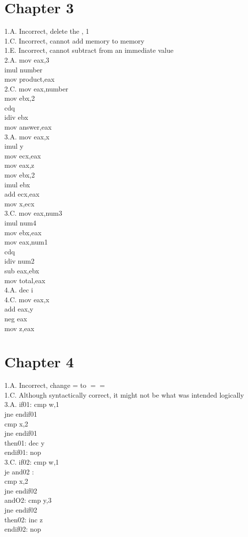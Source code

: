 \documentclass[10pt]{article}
\begin{document}
\section*{Chapter 3}
1.A. Incorrect, delete the , 1\\
1.C. Incorrect, cannot add memory to memory\\
1.E. Incorrect, cannot subtract from an immediate value\\
2.A. mov eax,3\\
imul number\\
mov product,eax\\
2.C. mov eax,number\\
mov ebx,2\\
cdq\\
idiv ebx\\
mov answer,eax\\
3.A. mov eax,x\\
imul y\\
mov ecx,eax\\
mov eax,z\\
mov ebx,2\\
imul ebx\\
add ecx,eax\\
mov x,ecx\\
3.C. mov eax,num3\\
imul num4\\
mov ebx,eax\\
mov eax,num1\\
cdq\\
idiv num2\\
sub eax,ebx\\
mov total,eax\\
4.A. dec i\\
4.C. mov eax,x\\
add eax,y\\
neg eax\\
mov z,eax

\section*{Chapter 4}
1.A. Incorrect, change = to $==$\\
1.C. Although syntactically correct, it might not be what was intended logically\\
3.A. if01: cmp w,1\\
jne endif01\\
cmp x,2\\
jne endif01\\
then01: dec y\\
endif01: nop\\
3.C. if02: cmp w,1\\
je and02 :\\
cmp x,2\\
jne endif02\\
andO2: cmp y,3\\
jne endif02\\
then02: inc z\\
endif02: nop
\end{document}
